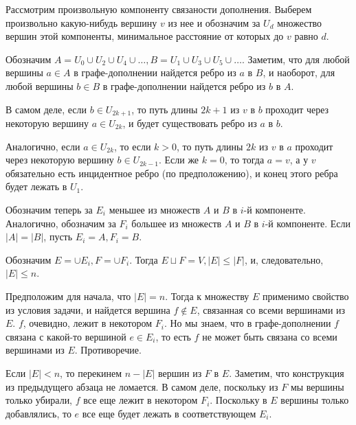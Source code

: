 \documentclass{article}
\newcommand{\abs}[1]{\left\lvert#1\right\rvert}
\begin{document}
	Рассмотрим произвольную компоненту связаности дополнения. Выберем произвольно какую-нибудь вершину $v$ из нее и обозначим за $U_d$ множество вершин этой компоненты, минимальное расстояние от которых до $v$ равно $d$.

	Обозначим $A = U_0 \cup U_2 \cup U_4 \cup \dots, B = U_1 \cup U_3 \cup U_5 \cup \dots$. Заметим, что для любой вершины $a \in A$ в графе-дополнении найдется ребро из $a$ в $B$, и наоборот, для любой вершины $b \in B$ в графе-дополнении найдется ребро из $b$ в $A$.

	В самом деле, если $b \in U_{2k+1}$, то путь длины $2k+1$ из $v$ в $b$ проходит через некоторую вершину $a \in U_{2k}$, и будет существовать ребро из $a$ в $b$.

	Аналогично, если $a \in U_{2k}$, то если $k > 0$, то путь длины $2k$ из $v$ в $a$ проходит через некоторую вершину $b \in U_{2k-1}$. Если же $k = 0$, то тогда $a = v$, а у $v$ обязательно есть инцидентное ребро (по предположению), и конец этого ребра будет лежать в $U_1$.

	Обозначим теперь за $E_i$ меньшее из множеств $A$ и $B$ в $i$-й компоненте. Аналогично, обозначим за $F_i$ большее из множеств $A$ и $B$ в $i$-й компоненте. Если $\abs{A} = \abs{B}$, пусть $E_i = A, F_i = B$.

	Обозначим $E = \cup E_i, F = \cup F_i$. Тогда $E \sqcup F = V, \abs{E} \le \abs{F}$, и, следовательно, $\abs{E} \le n$.

	Предположим для начала, что $\abs{E} = n$. Тогда к множеству $E$ применимо свойство из условия задачи, и найдется вершина $f \not\in E$, связанная со всеми вершинами из $E$. $f$, очевидно, лежит в некотором $F_i$. Но мы знаем, что в графе-дополнении $f$ связана с какой-то вершиной $e \in E_i$, то есть $f$ не может быть связана со всеми вершинами из $E$. Противоречие.

	Если $\abs{E} < n$, то перекинем $n - \abs{E}$ вершин из $F$ в $E$. Заметим, что конструкция из предыдущего абзаца не ломается. В самом деле, поскольку из $F$ мы вершины только убирали, $f$ все еще лежит в некотором $F_i$. Поскольку в $E$ вершины только добавлялись, то $e$ все еще будет лежать в соответствующем $E_i$. 
\end{document}
